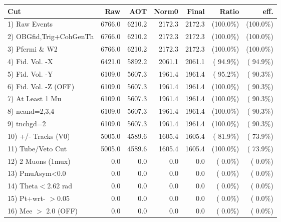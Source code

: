  \begin{table}[h!]\centering
 \begin{tabular}{||l||r|r|r|r|r|r||}
 \hline
 \hline
 Cut & Raw & AOT & Norm0 & Final & Ratio & eff.       \\
 \hline
  1) Raw Events           &       6766.0 &       6210.2 &       2172.3 &       2172.3 & (100.0\%) & (100.0\%) \\
  2) OBGfid,Trig+CohGenTh &       6766.0 &       6210.2 &       2172.3 &       2172.3 & (100.0\%) & (100.0\%) \\
  3) Pfermi \& W2         &       6766.0 &       6210.2 &       2172.3 &       2172.3 & (100.0\%) & (100.0\%) \\
  4) Fid. Vol. -X         &       6421.0 &       5892.2 &       2061.1 &       2061.1 & ( 94.9\%) & ( 94.9\%) \\
  5) Fid. Vol. -Y         &       6109.0 &       5607.3 &       1961.4 &       1961.4 & ( 95.2\%) & ( 90.3\%) \\
  6) Fid. Vol. -Z (OFF)   &       6109.0 &       5607.3 &       1961.4 &       1961.4 & (100.0\%) & ( 90.3\%) \\
  7) At Least 1 Mu        &       6109.0 &       5607.3 &       1961.4 &       1961.4 & (100.0\%) & ( 90.3\%) \\
  8) ncand=2,3,4          &       6109.0 &       5607.3 &       1961.4 &       1961.4 & (100.0\%) & ( 90.3\%) \\
  9) tnchgd=2             &       6109.0 &       5607.3 &       1961.4 &       1961.4 & (100.0\%) & ( 90.3\%) \\
 10) +/- Tracks (V0)      &       5005.0 &       4589.6 &       1605.4 &       1605.4 & ( 81.9\%) & ( 73.9\%) \\
 11) Tube/Veto Cut        &       5005.0 &       4589.6 &       1605.4 &       1605.4 & (100.0\%) & ( 73.9\%) \\
 12) 2 Muons (1mux)       &          0.0 &          0.0 &          0.0 &          0.0 & (  0.0\%) & (  0.0\%) \\
 13) PmuAsym<0.0          &          0.0 &          0.0 &          0.0 &          0.0 & (  0.0\%) & (  0.0\%) \\
 14) Theta$<$2.62 rad     &          0.0 &          0.0 &          0.0 &          0.0 & (  0.0\%) & (  0.0\%) \\
 15) Pt+wrt- $>$0.05      &          0.0 &          0.0 &          0.0 &          0.0 & (  0.0\%) & (  0.0\%) \\
 16) Mee $>$ 2.0  (OFF)   &          0.0 &          0.0 &          0.0 &          0.0 & (  0.0\%) & (  0.0\%) \\

\end{tabular}
\end{table}
